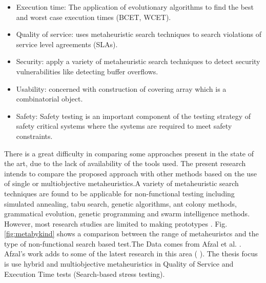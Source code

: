 \documentclass{report}
\begin{document}
\begin{itemize}
\item Execution time: The application of evolutionary algorithms to find the best and worst case execution times (BCET, WCET).
\item Quality of service: uses metaheuristic search techniques to search violations of service level agreements (SLAs).
\item Security: apply a variety of metaheuristic search techniques  to detect security vulnerabilities like detecting buffer overflows.
\item Usability: concerned with construction of covering array which is a combinatorial object.
\item Safety: Safety testing is an important component of the testing strategy of safety critical systems where the systems are required to meet safety constraints.
\end{itemize}

There is a great difficulty in
comparing some approaches present in the state of
the art, due to the lack of availability of the tools used. The present research intends to compare the proposed approach with other methods based on the use of single or multiobjective metaheuristics.A variety of metaheuristic search techniques are found to be applicable for non-functional testing including simulated annealing, tabu search, genetic algorithms, ant colony methods, grammatical evolution, genetic programming and swarm intelligence methods. However, most research studies are limited to making prototypes \cite{Afzal2009a}.  Fig. \ref{fig:metabykind} shows a comparison between the range of metaheuristcs and the type of non-functional search based test.The Data comes from Afzal et al. \cite{Afzal2009a}. Afzal's work adds to some of the latest research in this area (\cite{Garousi2006} \cite{Garousi2010} \cite{DiAlesio2013} \cite{DiAlesio2014} \cite{Alesio2015} \cite{Gois2016}). The thesis focus is use  hybrid and multiobjective metaheuristics in Quality of Service and Execution Time tests (Search-based stress testing).
\end{document}

